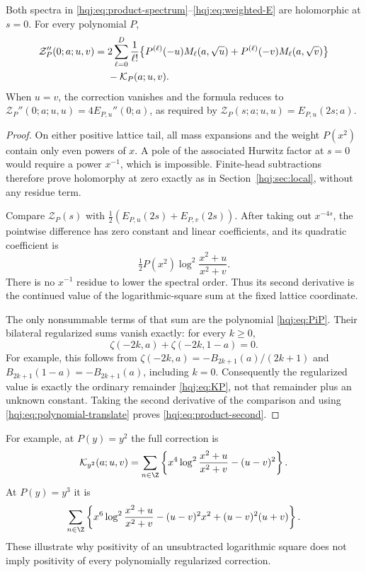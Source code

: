 \begin{theorem}
\label{hqj:thm:product}
Both spectra in \eqref{hqj:eq:product-spectrum}--\eqref{hqj:eq:weighted-E}
are holomorphic at $s=0$. For every polynomial $P$,
\begin{align}
\mathcal Z_P''(0;a;u,v)
={}&2\sum_{\ell=0}^D\frac1{\ell!}
\bigl\{P^{(\ell)}(-u)M_\ell(a,\sqrt u)
+P^{(\ell)}(-v)M_\ell(a,\sqrt v)\bigr\}
\notag\\
&-\mathcal K_P(a;u,v).
\label{hqj:eq:product-second}
\end{align}
When $u=v$, the correction vanishes and the formula reduces to
$\mathcal Z_P''(0;a;u,u)=4E_{P,u}''(0;a)$, as required by
$\mathcal Z_P(s;a;u,u)=E_{P,u}(2s;a)$.
\end{theorem}
\begin{proof}
On either positive lattice tail, all mass expansions and the weight
$P(x^2)$ contain only even powers of $x$. A pole of the associated
Hurwitz factor at $s=0$ would require a power $x^{-1}$, which is
impossible. Finite-head subtractions therefore prove holomorphy at
zero exactly as in Section~\ref{hqj:sec:local}, without any residue
term.

Compare $\mathcal Z_P(s)$ with
$\tfrac12(E_{P,u}(2s)+E_{P,v}(2s))$. After taking out $x^{-4s}$,
the pointwise difference has zero constant and linear coefficients,
and its quadratic coefficient is
\[
\tfrac12P(x^2)\log^2\frac{x^2+u}{x^2+v}.
\]
There is no $x^{-1}$ residue to lower the spectral order. Thus its
second derivative is the continued value of the logarithmic-square
sum at the fixed lattice coordinate.

The only nonsummable terms of that sum are the polynomial
\eqref{hqj:eq:PiP}. Their bilateral regularized sums vanish exactly:
for every $k\ge0$,
\begin{equation}\label{hqj:eq:even-polynomial-zero}
\zeta(-2k,a)+\zeta(-2k,1-a)=0.
\end{equation}
For example, this follows from
$\zeta(-2k,a)=-B_{2k+1}(a)/(2k+1)$ and
$B_{2k+1}(1-a)=-B_{2k+1}(a)$, including $k=0$.
Consequently the regularized value is exactly the ordinary remainder
\eqref{hqj:eq:KP}, not that remainder plus an unknown constant.
Taking the second derivative of the comparison and using
\eqref{hqj:eq:polynomial-translate} proves
\eqref{hqj:eq:product-second}.
\end{proof}

For example, at $P(y)=y^2$ the full correction is
\[
\mathcal K_{y^2}(a;u,v)=\sum_{n\in\Z}
\left\{x^4\log^2\frac{x^2+u}{x^2+v}-(u-v)^2\right\}.
\]
At $P(y)=y^3$ it is
\[
\sum_{n\in\Z}\left\{x^6\log^2\frac{x^2+u}{x^2+v}
-(u-v)^2x^2+(u-v)^2(u+v)\right\}.
\]
These illustrate why positivity of an unsubtracted logarithmic square
does not imply positivity of every polynomially regularized correction.

